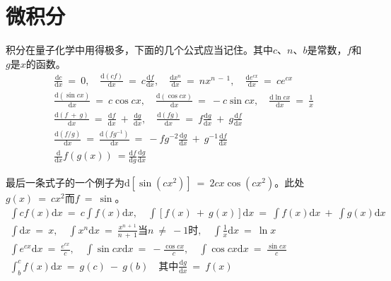 \documentclass[12pt,a4paper,openany]{ctexbook}
\begin{document}
\section{微积分}
\begin{flushleft}
    \setlength{\parindent}{2em}
积分在量子化学中用得极多，下面的几个公式应当记住。其中$c$、$n$、$b$是常数，$f$和$g$是$x$的函数。
\begin{gather*}
    \boxed{\frac{\mathrm{d}c}{\mathrm{d}x}\ =\ 0,\quad\frac{\mathrm{d}(cf)}{\mathrm{d}x}\ =\ c\frac{\mathrm{d}f}{\mathrm{d}x},\quad\frac{\mathrm{d}x^n}{\mathrm{d}x}\ =\ nx^{n\ -\ 1},\quad\frac{\mathrm{d}e^{cx}}{\mathrm{d}x}\ =\ ce^{cx}} \\
    \boxed{\frac{\mathrm{d}(\sin cx)}{\mathrm{d}x}\ =\ c\cos cx,\quad\frac{\mathrm{d}(\cos cx)}{\mathrm{d}x}\ =\ -c\sin cx,\quad\frac{\mathrm{d}\ln cx}{\mathrm{d}x}\ =\ \frac{1}{x}} \\
    \boxed{\frac{\mathrm{d}(f\ +\ g)}{\mathrm{d}x}\ =\ \frac{\mathrm{d}f}{\mathrm{d}x}\ +\ \frac{\mathrm{d}g}{\mathrm{d}x},\quad\frac{\mathrm{d}(fg)}{\mathrm{d}x}\ =\ f\frac{\mathrm{d}g}{\mathrm{d}x}\ +\ g\frac{\mathrm{d}f}{\mathrm{d}x}} \\
    \boxed{\frac{\mathrm{d}(f/g)}{\mathrm{d}x}\ =\ \frac{\mathrm{d}(fg^{-1})}{\mathrm{d}x}\ =\ -fg^{-2}\frac{\mathrm{d}g}{\mathrm{d}x}\ +\ g^{-1}\frac{\mathrm{d}f}{\mathrm{d}x}} \\
    \boxed{\frac{\mathrm{d}}{\mathrm{d}x}f(g(x))\ =\frac{\mathrm{d}f}{\mathrm{d}g}\frac{\mathrm{d}g}{\mathrm{d}x}}
\end{gather*}

最后一条式子的一个例子为$\mathrm{d}[\sin(cx^2)]\ =\ 2cx\cos(cx^2)$。此处$g(x)\ =\ cx^2$而$f\ =\ \sin$。
\begin{gather*}
    \boxed{\int cf(x)\mathrm{d}x\ =\ c\int f(x)\mathrm{d}x,\quad\int [f(x)\ +\ g(x)]\mathrm{d}x\ =\ \int f(x)\mathrm{d}x\ +\ \int g(x)\mathrm{d}x} \\
    \boxed{\int \mathrm{d}x\ =\ x,\quad\int x^n\mathrm{d}x\ =\ \frac{x^{n\ +\ 1}}{n\ +\ 1}\text{当}n\ \neq\ -1\text{时},\quad\int \frac{1}{x}\mathrm{d}x\ =\ \ln x} \\
    \boxed{\int e^{cx}\mathrm{d}x\ =\ \frac{e^{cx}}{c},\quad\int \sin cx\mathrm{d}x\ =\ -\frac{\cos cx}{c},\quad\int \cos cx\mathrm{d}x\ =\ \frac{\sin cx}{c}} \\
    \boxed{\int_b^c f(x)\mathrm{d}x\ =\ g(c)\ -\ g(b)\quad\text{其中}\frac{\mathrm{d}g}{\mathrm{d}x}\ =\ f(x)}
\end{gather*}
\end{flushleft}
\end{document}
